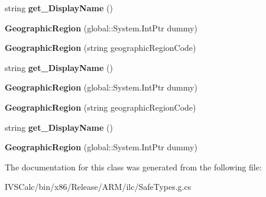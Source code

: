 \begin{DoxyCompactItemize}
string {\bfseries get\+\_\+\+Display\+Name} ()
\item 
\mbox{\label{class_windows_1_1_globalization_1_1_geographic_region_a6d2a220cf854c1044acd29508a6c68ce}} 
{\bfseries Geographic\+Region} (global\+::\+System.\+Int\+Ptr dummy)
\item 
\mbox{\label{class_windows_1_1_globalization_1_1_geographic_region_aa71031dcbb559dc6f6c0c0bf48d225f6}} 
{\bfseries Geographic\+Region} (string geographic\+Region\+Code)
\item 
\mbox{\label{class_windows_1_1_globalization_1_1_geographic_region_ac8251bbb94b0116513fcd6bded03c86d}} 
string {\bfseries get\+\_\+\+Display\+Name} ()
\item 
\mbox{\label{class_windows_1_1_globalization_1_1_geographic_region_a6d2a220cf854c1044acd29508a6c68ce}} 
{\bfseries Geographic\+Region} (global\+::\+System.\+Int\+Ptr dummy)
\item 
\mbox{\label{class_windows_1_1_globalization_1_1_geographic_region_aa71031dcbb559dc6f6c0c0bf48d225f6}} 
{\bfseries Geographic\+Region} (string geographic\+Region\+Code)
\item 
\mbox{\label{class_windows_1_1_globalization_1_1_geographic_region_ac8251bbb94b0116513fcd6bded03c86d}} 
string {\bfseries get\+\_\+\+Display\+Name} ()
\item 
\mbox{\label{class_windows_1_1_globalization_1_1_geographic_region_a6d2a220cf854c1044acd29508a6c68ce}} 
{\bfseries Geographic\+Region} (global\+::\+System.\+Int\+Ptr dummy)
\end{DoxyCompactItemize}


The documentation for this class was generated from the following file\+:\begin{DoxyCompactItemize}
\item 
I\+V\+S\+Calc/bin/x86/\+Release/\+A\+R\+M/ilc/Safe\+Types.\+g.\+cs\end{DoxyCompactItemize}

